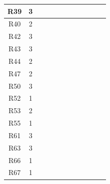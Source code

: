 \documentclass[12pt]{article}
\begin{document}
\begin{longtable}{|c|c|c|c|c|c|c|c|c|c|c|c|}
		\hline
		R39         & 3          &           &           &           &           &           &           &           &           &           &           \\
		\hline
		R40         & 2          &           &           &           &           &           &           &           &           &           &           \\
		\hline
		R42         & 3          &           &           &           &           &           &           &           &           &           &           \\
		\hline
		R43         & 3          &           &           &           &           &           &           &           &           &           &           \\
		\hline
		R44         & 2          &           &           &           &           &           &           &           &           &           &           \\
		\hline
		R47         & 2          &           &           &           &           &           &           &           &           &           & \ding{51} \\
		\hline
		R50         & 3          &           &           &           &           &           &           &           &           &           &           \\
		\hline
		R52         & 1          &           &           &           &           &           &           &           &           &           &           \\
		\hline
		R53         & 2          &           &           &           &           &           &           &           &           &           &           \\
		\hline
		R55         & 1          &           &           &           &           &           &           &           &           &           &           \\
		\hline
		R61         & 3          &           &           &           &           &           &           &           &           &           &           \\
		\hline
		R63         & 3          &           &           &           &           &           &           &           &           &           &           \\
		\hline
		R66         & 1          &           &           &           &           &           &           &           &           &           &           \\
		\hline
		R67         & 1          &           &           &           &           &           &           &           &           &           &           \\

\end{longtable}
\end{document}
